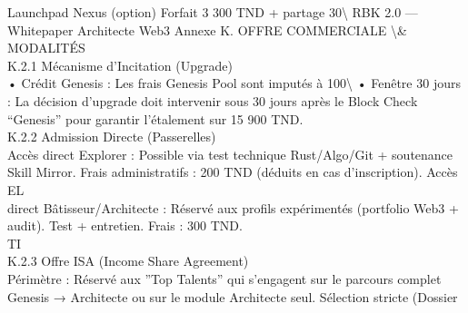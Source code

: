 Launchpad Nexus (option)            Forfait 3 300 TND + partage 30\textbackslash{}%
RBK 2.0 — Whitepaper Architecte Web3                                                                         Annexe K. OFFRE COMMERCIALE \textbackslash{}& MODALITÉS\\
\vspace{0.5em}
\vspace{0.5em}
K.2.1 Mécanisme d’Incitation (Upgrade)\\
• Crédit Genesis : Les frais Genesis Pool sont imputés à 100\textbackslash{}%
\vspace{0.5em}
• Fenêtre 30 jours : La décision d’upgrade doit intervenir sous 30 jours après le Block Check “Genesis” pour garantir l’étalement sur 15 900 TND.\\
\vspace{0.5em}
\vspace{0.5em}
K.2.2 Admission Directe (Passerelles)\\
Accès direct Explorer : Possible via test technique Rust/Algo/Git + soutenance Skill Mirror. Frais administratifs : 200 TND (déduits en cas d’inscription). Accès\\
\vspace{0.5em}
\vspace{0.5em}
\vspace{0.5em}
\vspace{0.5em}
EL\\
direct Bâtisseur/Architecte : Réservé aux profils expérimentés (portfolio Web3 + audit). Test + entretien. Frais : 300 TND.\\
\vspace{0.5em}
\vspace{0.5em}
\vspace{0.5em}
\vspace{0.5em}
TI\\
K.2.3 Offre ISA (Income Share Agreement)\\
Périmètre : Réservé aux ”Top Talents” qui s’engagent sur le parcours complet Genesis → Architecte ou sur le module Architecte seul. Sélection stricte (Dossier\\
\vspace{0.5em}
\vspace{0.5em}
\vspace{0.5em}
\vspace{0.5em}
